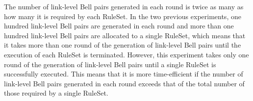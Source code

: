 The number of link-level Bell pairs generated in each round is twice as many as how many it is required by each RuleSet.
In the two previous experiments, one hundred link-level Bell pairs are generated in each round and more than one hundred link-level Bell pairs are allocated to a single RuleSet, which means that it takes more than one round of the generation of link-level Bell pairs until the execution of each RuleSet is terminated.
However, this experiment takes only one round of the generation of link-level Bell pairs until a single RuleSet is successfully executed.  This means that it is more time-efficient if the number of link-level Bell pairs generated in each round exceeds that of the total number of those required by a single RuleSet. 




